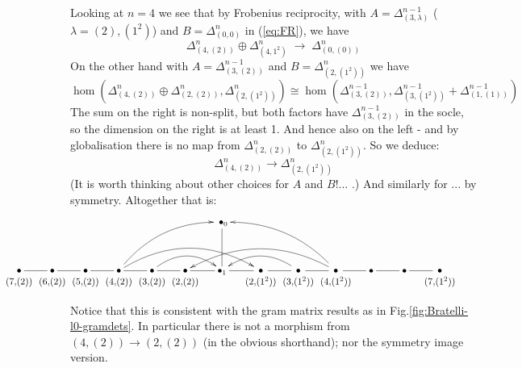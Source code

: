 \documentclass{article}
\newcommand{\ppm}[1]{\textcolor{red}{#1}}
\theoremstyle{definition}
\numberwithin{equation}{subsection}
\begin{document}
Looking at $n=4$ we see that by Frobenius reciprocity, 
with $A = \Delta^{n-1}_{(3,\lambda)}$ ($\lambda = (2), (1^2)$) and 
$B=\Delta^{n}_{(0,0)}$ in (\ref{eq:FR}), 
we have 
\[
\Delta^{n}_{(4,(2))} \oplus \Delta^{n}_{(4,1^2)} \; \rightarrow\; \Delta^{n}_{(0,(0))}
\]
On the other hand with $A=\Delta^{n-1}_{(3,(2))}$ and $B=\Delta^{n}_{(2,(1^2))}$ we have
\[
\hom(\Delta^{n}_{(4,(2))} \oplus \Delta^{n}_{(2,(2))} , \Delta^{n}_{(2,(1^2))} ) 
 \cong  
\hom(\Delta^{n-1}_{(3,(2))} , \Delta^{n-1}_{(3,(1^2))} + \Delta^{n-1}_{(1,(1))}) 
\]
The sum on the right is non-split, but both factors have $ \Delta^{n-1}_{(3,(2))} $ in the socle, so  the dimension on the right is at least 1. 
And hence also on the left - and by globalisation there is no map from 
$ \Delta^{n}_{(2,(2))}$ to $\Delta^{n}_{(2,(1^2))} $. So we deduce:
\[
\Delta^{n}_{(4,(2))}  \rightarrow   \Delta^{n}_{(2,(1^2))}
\]
(It is worth thinking about other choices for $A$ and $B$!... .) 
And similarly for ... by symmetry. 
Altogether that is:  %
\[
\hspace{-2.1cm} 
\xymatrix{
   &&&&&& \;\bullet_0 \ar@{-}[d] \\
\ver{(7,\!(2))} \ar@{-}[r] & 
\ver{(6,\!(2))} \ar@{-}[r] & 
\ver{(5,\!(2))} \ar@{-}[r] & 
\ver{(4,\!(2))} \ar@{-}[r] \ar@[red]@/^1.3pc/[rrru] \ar@[red]@/^1.9863pc/[rrrr] & 
\ver{(3,\!(2))} \ar@{-}[r] \ar@[red]@/^1.3pc/[rr] & 
\ver{(2,\!(2))} \ar@{-}[r] & 
\bullet_1 \ar@{-}[r] & 
\ver{(2,\!(1^2))} \ar@{-}[r] & 
\ver{(3,\!(1^2))} \ar@{-}[r] \ar@[red]@/_1.3pc/[ll] & 
\ver{(4,\!(1^2))} \ar@{-}[r] \ar@[red]@/_1.3pc/[lllu] \ar@[red]@/_1.93pc/[llll] & 
\bullet \ar@{-}[r] & 
\bullet \ar@{-}[r] & 
\ver{(7,\!(1^2))} & 
}
\] 

Notice that this is consistent with the gram matrix results as in Fig.\ref{fig:Bratelli-l0-gramdets}. 
In particular there is not a morphism from $(4,(2)) \rightarrow (2,(2))$ 
(in the obvious shorthand); nor the symmetry image version. 
\end{document}
